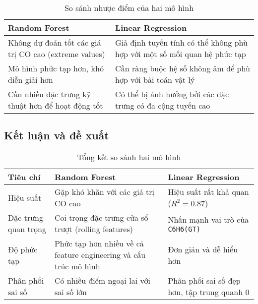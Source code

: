 \begin{table}[h]
\centering
\caption{So sánh nhược điểm của hai mô hình}
\begin{tabular}{p{7cm}|p{7cm}}
\toprule
\textbf{Random Forest} & \textbf{Linear Regression} \\
\midrule
Không dự đoán tốt các giá trị CO cao (extreme values) & Giả định tuyến tính có thể không phù hợp với một số mối quan hệ phức tạp \\
\midrule
Mô hình phức tạp hơn, khó diễn giải hơn & Cần ràng buộc hệ số không âm để phù hợp với bài toán vật lý \\
\midrule
Cần nhiều đặc trưng kỹ thuật hơn để hoạt động tốt & Có thể bị ảnh hưởng bởi các đặc trưng có đa cộng tuyến cao \\
\bottomrule
\end{tabular}
\end{table}

\subsection{Kết luận và đề xuất}


\begin{table}[H]
\centering
\caption{Tổng kết so sánh hai mô hình}
\begin{tabular}{p{3cm}|p{5.5cm}|p{5.5cm}}
\toprule
\textbf{Tiêu chí} & \textbf{Random Forest} & \textbf{Linear Regression} \\
\midrule
Hiệu suất & Gặp khó khăn với các giá trị CO cao & Hiệu suất rất khả quan ($R^2 = 0.87$) \\
\midrule
\raggedright Đặc trưng quan trọng & Coi trọng đặc trưng cửa sổ trượt (rolling features) & Nhấn mạnh vai trò của \texttt{C6H6(GT)} \\
\midrule
Độ phức tạp & Phức tạp hơn nhiều về cả feature engineering và cấu trúc mô hình & Đơn giản và dễ hiểu hơn \\
\midrule
Phân phối sai số & Có nhiều điểm ngoại lai với sai số lớn & Phân phối sai số đẹp hơn, tập trung quanh 0 \\
\bottomrule
\end{tabular}
\end{table}

